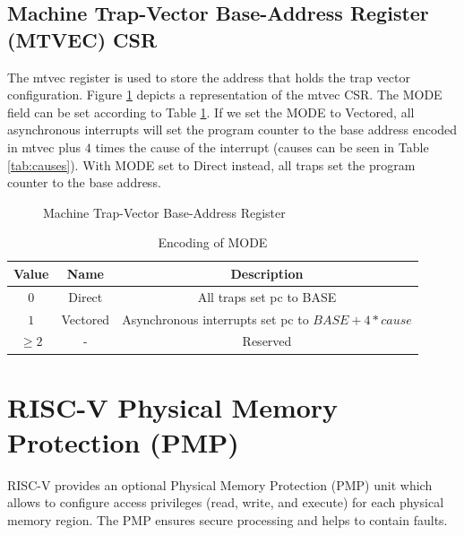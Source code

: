 \subsection{Machine Trap-Vector Base-Address Register (MTVEC) CSR}
\label{subsec:mtvec}

The mtvec register is used to store the address that holds the trap vector
configuration. Figure \ref{fig:mtvec} depicts a representation of the mtvec CSR.
The MODE field can be set according to Table \ref{tab:mode}. If we set the MODE to
Vectored, all asynchronous interrupts will set the program counter to the base
address encoded in mtvec plus $4$ times the cause of the interrupt (causes can be
seen in Table \ref{tab:causes}). With MODE set to Direct instead, all traps set
the program counter to the base address.

\begin{figure}[htbp]
  \centering
  \def\stackalignment{r} %
  {\scriptsize }
  \caption{Machine Trap-Vector Base-Address Register}
  \label{fig:mtvec}
\end{figure}

\begin{table}
  \centering
  \begin{tabular}{|c|c|c|}
    \hline
    \textbf{Value} & \textbf{Name} & \textbf{Description}                             \\
    \hline
    $0$            & Direct        & All traps set pc to BASE                         \\
    \hline
    $1$            & Vectored      & Asynchronous interrupts set pc to $BASE+4*cause$ \\
    \hline
    $\geq 2$       & -             & Reserved                                         \\
    \hline
  \end{tabular}
  \caption{Encoding of MODE}
  \label{tab:mode}
\end{table}

\section{RISC-V Physical Memory Protection (PMP)}
\label{sec:riscv_pmp}

RISC-V provides an optional Physical Memory Protection (PMP) unit which allows to
configure access privileges (read, write, and execute) for each physical memory region.
The PMP ensures secure processing and helps to contain faults.


